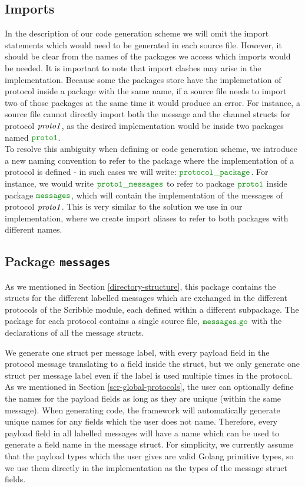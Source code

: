 \documentclass[12pt,twoside]{report}
\begin{document}
\subsection{Imports}
In the description of our code generation scheme we will omit the import statements which would need to be generated in each source file. However, it should be clear from the names of the packages we access which imports would be needed. It is important to note that import clashes may arise in the implementation. Because some the packages store have the implemetation of protocol inside a package with the same name, if a source file needs to import two of those packages at the same time it would produce an error. For instance, a source file cannot directly import both the message and the channel structs for protocol ${\mathit{proto1}}$, as the desired implementation would be inside two packages named $\pkgname{proto1}$.\\

To resolve this ambiguity when defining or code generation scheme, we introduce a new naming convention to refer to the package where the implementation of a protocol is defined - in such cases we will write: $\pkgname{protocol\_package}$. For instance, we would write $\pkgname{proto1\_messages}$ to refer to package $\pkgname{proto1}$ inside package $\pkgname{messages}$, which will contain the implementation of the messages of protocol ${\mathit{proto1}}$. This is very similar to the solution we use in our implementation, where we create import aliases to refer to both packages with different names.\\


\subsection{Package \texttt{messages}}
As we mentioned in Section \ref{directory-structure}, 
this package contains the structs for the different labelled messages which are exchanged in the different protocols of the Scribble module, each defined within a different subpackage. The package for each protocol contains a single source file, $\filename{messages}$ with the declarations of all the message structs.

We generate one struct per message label, with every payload field in the protocol message translating to a field inside the struct, but we only generate one struct per message label even if the label is used multiple times in the protocol. As we mentioned in Section \ref{scr-global-protocols}, the user can optionally define the names for the payload fields as long as they are unique (within the same message). When generating code, the framework will automatically generate unique names for any fields which the user does not name. Therefore, every payload field in all labelled messages will have a name which can be used to generate a field name in the message struct. For simplicity, we currently assume that the payload types which the user gives are valid Golang primitive types, so we use them directly in the implementation as the types of the message struct fields.
\end{document}
